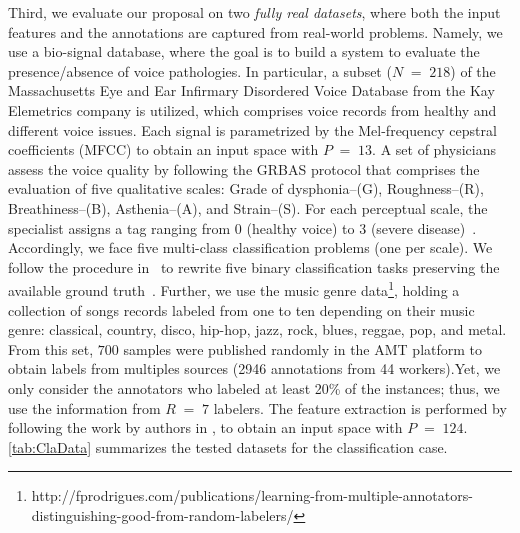 \documentclass[journal]{IEEEtran}
\DeclareMathOperator{\igual}{\!\,=\!\,}
\begin{document}
Third, we evaluate our proposal on two \textit{fully real datasets}, where both the input features and the annotations are captured from real-world problems. Namely, we use a bio-signal database, where the goal is to build a system to evaluate the presence/absence of voice pathologies. In particular, a subset ($N\igual218$) of the Massachusetts Eye and Ear Infirmary Disordered Voice Database from the Kay Elemetrics company is utilized, which comprises voice records from healthy and different voice issues.  Each signal is parametrized by the Mel-frequency cepstral coefficients (MFCC) to obtain an input space with $P\igual13$. A set of physicians assess the voice quality by following the GRBAS protocol that comprises the evaluation of five qualitative scales: Grade of dysphonia--(G), Roughness--(R), Breathiness--(B), Asthenia--(A), and Strain--(S). For each perceptual scale, the specialist assigns a tag ranging from 0 (healthy voice) to 3 (severe disease)~\cite{arias2011automatic}. Accordingly, we face five multi-class classification problems (one per scale).  We follow the procedure in~\cite{gil2018learning} to rewrite five binary classification tasks preserving the available ground truth~\cite{gonzalez2015automatic}. Further, we use the music genre data\footnote{http://fprodrigues.com/publications/learning-from-multiple-annotators-distinguishing-good-from-random-labelers/}, holding a collection of songs records labeled from one to ten depending on their music genre: classical, country, disco, hip-hop, jazz, rock, blues, reggae, pop, and metal. From this set, $700$ samples were published randomly in the AMT platform to obtain labels from multiples sources (2946 annotations from 44 workers).Yet, we only consider the annotators who labeled at least 20\% of the instances; thus, we use the information from $R \igual 7$ labelers. The feature extraction is performed by following the work by authors in \cite{rodrigues2013learning}, to obtain an input space with $P\igual124$. \cref{tab:ClaData} summarizes the tested datasets for the classification case.
\end{document}
